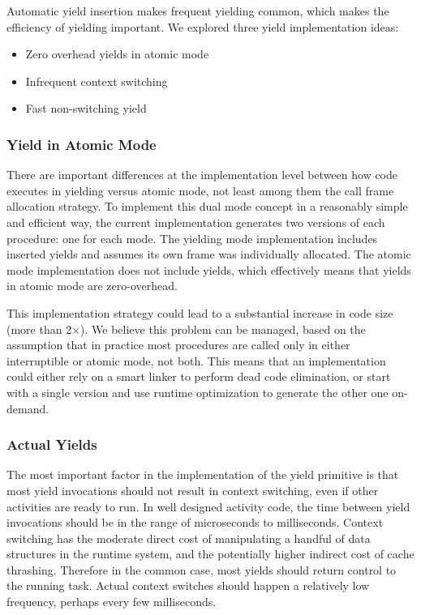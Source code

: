 \documentclass[acmsmall,anonymous,review]{acmart}\settopmatter{printfolios=true,printccs=false,printacmref=false}
\begin{document}
Automatic yield insertion makes frequent yielding common, which makes the efficiency of yielding important.
We explored three yield implementation ideas:

\begin{itemize}
\item Zero overhead yields in atomic mode
\item Infrequent context switching
\item Fast non-switching yield
\end{itemize}

\subsubsection{Yield in Atomic Mode}

There are important differences at the implementation level between how code executes in yielding versus atomic mode, not least among them the call frame allocation strategy.
To implement this dual mode concept in a reasonably simple and efficient way, the current \charcoal{} implementation generates two versions of each procedure: one for each mode.
The yielding mode implementation includes inserted yields and assumes its own frame was individually allocated.
The atomic mode implementation does not include yields, which effectively means that yields in atomic mode are zero-overhead.

This implementation strategy could lead to a substantial increase in code size (more than 2$\times$).
We believe this problem can be managed, based on the assumption that in practice most procedures are called only in either interruptible or atomic mode, not both.
This means that an implementation could either rely on a smart linker to perform dead code elimination, or start with a single version and use runtime optimization to generate the other one on-demand.

\subsubsection{Actual Yields}

The most important factor in the implementation of the yield primitive is that most yield invocations should not result in context switching, even if other activities are ready to run.
In well designed activity code, the time between yield invocations should be in the range of microseconds to milliseconds.
Context switching has the moderate direct cost of manipulating a handful of data structures in the runtime system, and the potentially higher indirect cost of cache thrashing.
Therefore in the common case, most yields should return control to the running task.
Actual context switches should happen a relatively low frequency, perhaps every few milliseconds.
\end{document}
